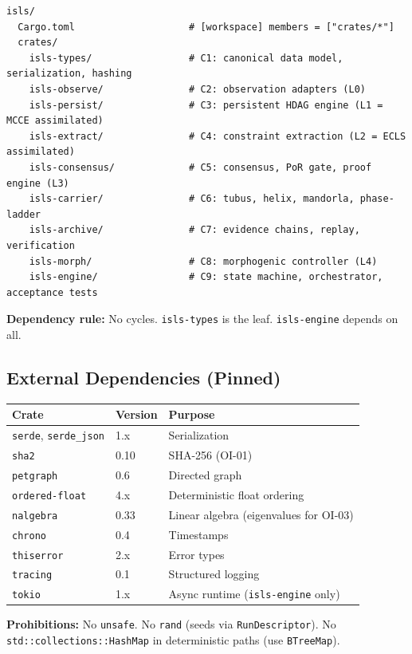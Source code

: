 \documentclass[10pt,a4paper]{article}
\theoremstyle{definition}\newtheorem{definition}{Def}[section]
\theoremstyle{plain}\newtheorem{theorem}{Thm}[section]
\newcommand{\crate}[1]{\texttt{\small\color{rustborder!80!black}#1}}
\newcommand{\ty}[1]{\texttt{\small\color{accent}#1}}
\begin{document}
\begin{lstlisting}[style=yaml]
isls/
  Cargo.toml                    # [workspace] members = ["crates/*"]
  crates/
    isls-types/                 # C1: canonical data model, serialization, hashing
    isls-observe/               # C2: observation adapters (L0)
    isls-persist/               # C3: persistent HDAG engine (L1 = MCCE assimilated)
    isls-extract/               # C4: constraint extraction (L2 = ECLS assimilated)
    isls-consensus/             # C5: consensus, PoR gate, proof engine (L3)
    isls-carrier/               # C6: tubus, helix, mandorla, phase-ladder
    isls-archive/               # C7: evidence chains, replay, verification
    isls-morph/                 # C8: morphogenic controller (L4)
    isls-engine/                # C9: state machine, orchestrator, acceptance tests
\end{lstlisting}

\textbf{Dependency rule:} No cycles. \crate{isls-types} is the leaf. \crate{isls-engine} depends on all.

\subsection{External Dependencies (Pinned)}
\begin{tabular}{l l l}
\toprule \textbf{Crate} & \textbf{Version} & \textbf{Purpose} \\
\midrule
\texttt{serde}, \texttt{serde\_json} & 1.x & Serialization \\
\texttt{sha2} & 0.10 & SHA-256 (OI-01) \\
\texttt{petgraph} & 0.6 & Directed graph \\
\texttt{ordered-float} & 4.x & Deterministic float ordering \\
\texttt{nalgebra} & 0.33 & Linear algebra (eigenvalues for OI-03) \\
\texttt{chrono} & 0.4 & Timestamps \\
\texttt{thiserror} & 2.x & Error types \\
\texttt{tracing} & 0.1 & Structured logging \\
\texttt{tokio} & 1.x & Async runtime (\crate{isls-engine} only) \\
\bottomrule
\end{tabular}

\textbf{Prohibitions:} No \texttt{unsafe}. No \texttt{rand} (seeds via \ty{RunDescriptor}). No \texttt{std::collections::HashMap} in deterministic paths (use \texttt{BTreeMap}).
\end{document}
